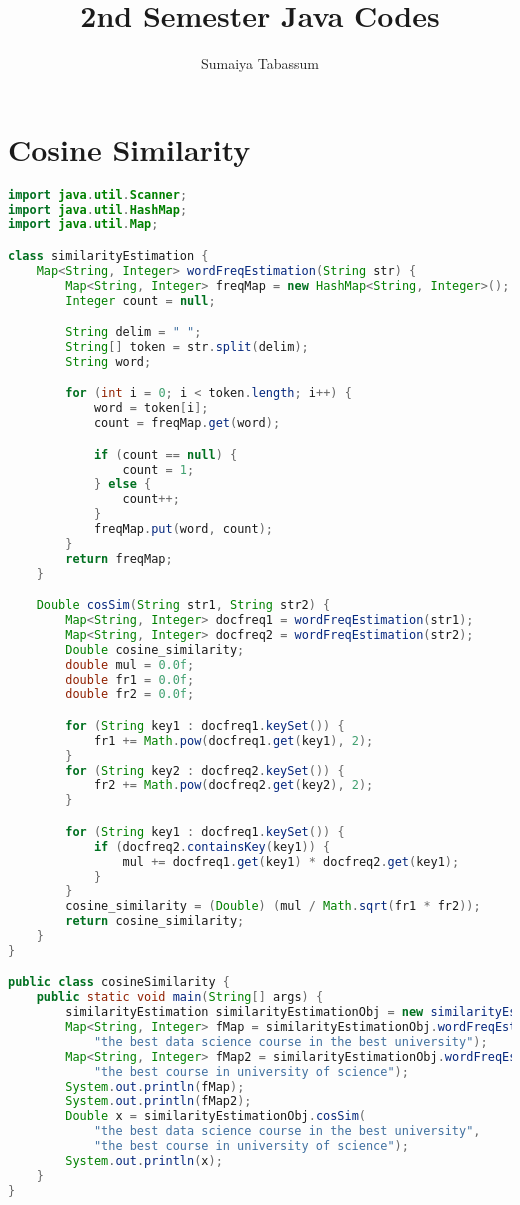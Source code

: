 \documentclass{article}
\title{2nd Semester Java Codes}
\author{Sumaiya Tabassum}
\begin{document}
\maketitle
\tableofcontents
\clearpage

\section{Cosine Similarity}
\begin{lstlisting}[language=Java, caption=Cosine Similarity Implementation]
import java.util.Scanner;
import java.util.HashMap;
import java.util.Map;

class similarityEstimation {
    Map<String, Integer> wordFreqEstimation(String str) {
        Map<String, Integer> freqMap = new HashMap<String, Integer>();
        Integer count = null;

        String delim = " ";
        String[] token = str.split(delim);
        String word;

        for (int i = 0; i < token.length; i++) {
            word = token[i];
            count = freqMap.get(word);

            if (count == null) {
                count = 1;
            } else {
                count++;
            }
            freqMap.put(word, count);
        }
        return freqMap;
    }

    Double cosSim(String str1, String str2) {
        Map<String, Integer> docfreq1 = wordFreqEstimation(str1);
        Map<String, Integer> docfreq2 = wordFreqEstimation(str2);
        Double cosine_similarity;
        double mul = 0.0f;
        double fr1 = 0.0f;
        double fr2 = 0.0f;

        for (String key1 : docfreq1.keySet()) {
            fr1 += Math.pow(docfreq1.get(key1), 2);
        }
        for (String key2 : docfreq2.keySet()) {
            fr2 += Math.pow(docfreq2.get(key2), 2);
        }

        for (String key1 : docfreq1.keySet()) {
            if (docfreq2.containsKey(key1)) {
                mul += docfreq1.get(key1) * docfreq2.get(key1);
            }
        }
        cosine_similarity = (Double) (mul / Math.sqrt(fr1 * fr2));
        return cosine_similarity;
    }
}

public class cosineSimilarity {
    public static void main(String[] args) {
        similarityEstimation similarityEstimationObj = new similarityEstimation();
        Map<String, Integer> fMap = similarityEstimationObj.wordFreqEstimation(
            "the best data science course in the best university");
        Map<String, Integer> fMap2 = similarityEstimationObj.wordFreqEstimation(
            "the best course in university of science");
        System.out.println(fMap);
        System.out.println(fMap2);
        Double x = similarityEstimationObj.cosSim(
            "the best data science course in the best university",
            "the best course in university of science");
        System.out.println(x);
    }
}
\end{lstlisting}
\end{document}
